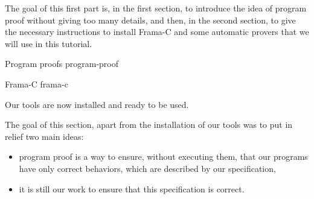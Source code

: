 The goal of this first part is, in the first section, to introduce the
idea of program proof without giving too many details, and then, in the
second section, to give the necessary instructions to install Frama-C
and some automatic provers that we will use in this tutorial.



\begin{levelTwo}
  {Program proofs}
  {program-proof}
\end{levelTwo}

\begin{levelTwo}
  {Frama-C}
  {frama-c}
\end{levelTwo}



\horizontalLine
\newpage


Our tools are now installed and ready to be used.



The goal of this section, apart from the installation of our tools was to put
in relief two main ideas:
\begin{itemize}
\item program proof is a way to ensure, without executing them, that our programs
  have only correct behaviors, which are described by our specification,
\item it is still our work to ensure that this specification is correct.
\end{itemize}
